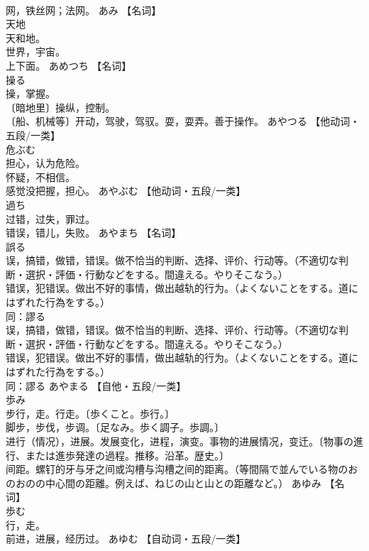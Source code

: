 \documentclass[8pt]{extreport}
\begin{document}
\begin{CJK}{UTF8}{min}
\\	网，铁丝网；法网。	あみ		【名词】
\\	天地	
\\	天和地。 
\\	世界，宇宙。 
\\	上下面。	あめつち		【名词】
\\	操る	
\\	操，掌握。 
\\	〔暗地里〕操纵，控制。 
\\	〔船、机械等〕开动，驾驶，驾驭。耍，耍弄。善于操作。	あやつる		【他动词・五段/一类】
\\	危ぶむ	
\\	担心，认为危险。 
\\	怀疑，不相信。 
\\	感觉没把握，担心。	あやぶむ		【他动词・五段/一类】
\\	過ち	
\\	过错，过失，罪过。 
\\	错误，错儿，失败。	あやまち		【名词】
\\	誤る	
\\	误，搞错，做错，错误。做不恰当的判断、选择、评价、行动等。（不適切な判断・選択・評価・行動などをする。間違える。やりそこなう。） 
\\	错误，犯错误。做出不好的事情，做出越轨的行为。（よくないことをする。道にはずれた行為をする。） 
\\	同：謬る 
\\	误，搞错，做错，错误。做不恰当的判断、选择、评价、行动等。（不適切な判断・選択・評価・行動などをする。間違える。やりそこなう。） 
\\	错误，犯错误。做出不好的事情，做出越轨的行为。（よくないことをする。道にはずれた行為をする。） 
\\	同：謬る	あやまる		【自他・五段/一类】
\\	歩み	
\\	步行，走。行走。〔歩くこと。歩行。〕 
\\	脚步，步伐，步调。〔足なみ。歩く調子。歩調。〕 
\\	进行（情况），进展。发展变化，进程，演变。事物的进展情况，变迁。〔物事の進行、または進歩発達の過程。推移。沿革。歴史。〕 
\\	间距。螺钉的牙与牙之间或沟槽与沟槽之间的距离。（等間隔で並んでいる物のおのおのの中心間の距離。例えば、ねじの山と山との距離など。）	あゆみ		【名词】
\\	歩む	
\\	行，走。 
\\	前进，进展，经历过。	あゆむ		【自动词・五段/一类】

\end{CJK}
\end{document}
